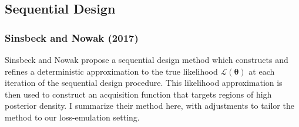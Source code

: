 \documentclass[12pt]{article}
\newcommand{\btheta}{\boldsymbol{\theta}}
\begin{document}
\subsection{Sequential Design}

\subsubsection{Sinsbeck and Nowak (2017)}
Sinsbeck and Nowak \cite{doi:10.1137/15M1047659} propose a sequential design method which constructs and refines a deterministic approximation to the true likelihood $\mathcal{L}(\btheta)$ at each iteration of the sequential design procedure. 
This likelihood approximation is then used to construct an acquisition function that targets regions of high posterior density. I summarize their method here, with adjustments to tailor the method to our loss-emulation setting. 
\end{document}
